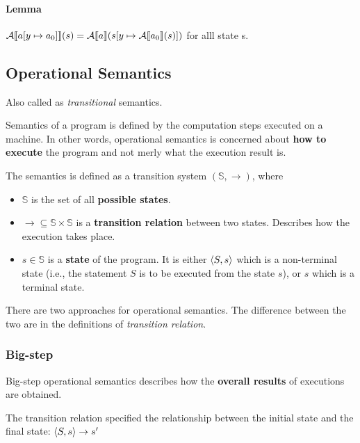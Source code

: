 \paragraph{Lemma}
$\mathcal{A} \llbracket  a[y \mapsto a_0]  \rrbracket (s) = \mathcal{A} \llbracket a \rrbracket (s [ y
\mapsto \mathcal{A} \llbracket a_0 \rrbracket (s)]) $ for alll state s.



\subsection{Operational Semantics}

Also called as \textit{transitional} semantics.

Semantics of a program is defined by the computation steps executed on
a machine. In other words, operational semantics is concerned about
\textbf{how to execute} the program and not merly what the execution
result is.

The semantics is defined as a transition system
$ ( \mathbb{S}, \to ) $, where

\begin{itemize}
\item $ \mathbb{S} $ is the set of all \textbf{possible states}.
\item $ \to \subseteq \mathbb{S} \times \mathbb{S} $ is a
  \textbf{transition relation} between two states. Describes how the
  execution takes place.
\item $ s \in \mathbb{S} $ is a \textbf{state} of the program. It is
  either $ \langle  S, s  \rangle$ which is a non-terminal state (i.e., the
  statement $ S $ is to be executed from the state $ s $), or $ s $
  which is a terminal state.
\end{itemize}

There are two approaches for operational semantics.  The difference
between the two are in the definitions of \textsl{transition
  relation}.

\subsubsection{Big-step}
\label{sec:big-step}

Big-step operational semantics describes how the \textbf{overall
  results} of executions are obtained.

The transition relation specified the relationship between the initial
state and the final state: $ \langle  S, s  \rangle \to s' $


